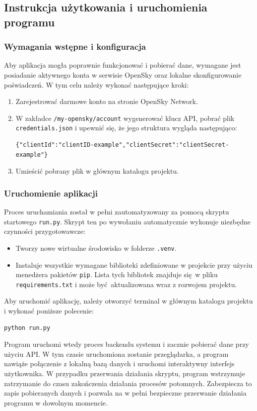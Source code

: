 \documentclass[12pt,a4paper]{article}
\begin{document}
\subsection{Instrukcja użytkowania i uruchomienia programu}

\subsubsection{Wymagania wstępne i konfiguracja}

Aby aplikacja mogła poprawnie funkcjonować i pobierać dane, wymagane jest posiadanie aktywnego konta w serwisie OpenSky oraz lokalne skonfigurowanie poświadczeń. W tym celu należy wykonać następujące kroki:

\begin{enumerate}
    \item Zarejestrować darmowe konto na stronie OpenSky Network.
    \item W zakładce \texttt{/my-opensky/account} wygenerować klucz API, pobrać plik \texttt{credentials.json} i upewnić się, że jego struktura wygląda następująco:

\begin{verbatim}
{"clientId":"clientID-example","clientSecret":"clientSecret-example"}
\end{verbatim}

    \item Umieścić pobrany plik w głównym katalogu projektu.
\end{enumerate}

\subsubsection{Uruchomienie aplikacji}

Proces uruchamiania został w pełni zautomatyzowany za pomocą skryptu startowego \texttt{run.py}. Skrypt ten po wywołaniu automatycznie wykonuje niezbędne czynności przygotowawcze:

\begin{itemize}
    \item Tworzy nowe wirtualne środowisko w folderze \texttt{.venv}.
    \item Instaluje wszystkie wymagane biblioteki zdefiniowane w projekcie przy użyciu menedżera pakietów \texttt{pip}. Lista tych bibliotek znajduje się w pliku \texttt{requirements.txt} i może być aktualizowana wraz z rozwojem projektu.
\end{itemize}

Aby uruchomić aplikację, należy otworzyć terminal w głównym katalogu projektu i wykonać poniższe polecenie:

\begin{verbatim}
python run.py
\end{verbatim}

Program uruchomi wtedy proces backendu systemu i zacznie pobierać dane przy użyciu API. W tym czasie uruchomiona zostanie przeglądarka, a program nawiąże połączenie z lokalną bazą danych i uruchomi interaktywny interfejs użytkownika. W przypadku przerwania działania skryptu, program wstrzymuje zatrzymanie do czasu zakończenia działania procesów potomnych. Zabezpiecza to zapis pobieranych danych i pozwala na w pełni bezpieczne przerwanie działania programu w dowolnym momencie.
\end{document}
